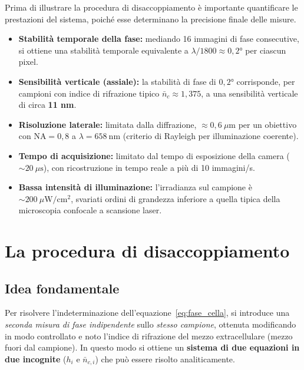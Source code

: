 Prima di illustrare la procedura di disaccoppiamento è importante quantificare le
prestazioni del sistema, poiché esse determinano la precisione finale delle misure.

\begin{itemize}
  \item \textbf{Stabilità temporale della fase:} mediando 16 immagini di fase
        consecutive, si ottiene una stabilità temporale equivalente a
        $\lambda/1800 \approx 0{,}2°$ per ciascun pixel.
  \item \textbf{Sensibilità verticale (assiale):} la stabilità di fase di $0{,}2°$
        corrisponde, per campioni con indice di rifrazione tipico
        $\bar{n}_c \approx 1{,}375$, a una sensibilità verticale di circa
        \textbf{11 nm}.
  \item \textbf{Risoluzione laterale:} limitata dalla diffrazione,
        $\approx 0{,}6\ \mu\mathrm{m}$ per un obiettivo con
        $\mathrm{NA} = 0{,}8$ a $\lambda = 658\ \mathrm{nm}$ (criterio di
        Rayleigh per illuminazione coerente).
  \item \textbf{Tempo di acquisizione:} limitato dal tempo di esposizione della
        camera ($\sim 20\ \mu\mathrm{s}$), con ricostruzione in tempo reale a
        più di 10 immagini/s.
  \item \textbf{Bassa intensità di illuminazione:} l'irradianza sul campione è
        $\sim 200\ \mu\mathrm{W/cm^2}$, svariati ordini di grandezza inferiore a
        quella tipica della microscopia confocale a scansione laser.
\end{itemize}

\section{La procedura di disaccoppiamento}
\label{sec:decoupling}

\subsection{Idea fondamentale}

Per risolvere l'indeterminazione dell'equazione~\eqref{eq:fase_cella}, si introduce
una \emph{seconda misura di fase indipendente} sullo \emph{stesso campione},
ottenuta modificando in modo controllato e noto l'indice di rifrazione del mezzo
extracellulare (mezzo fuori dal campione). In questo modo si ottiene un \textbf{sistema di due equazioni in due
incognite} ($h_i$ e $\bar{n}_{c,i}$) che può essere risolto analiticamente.

